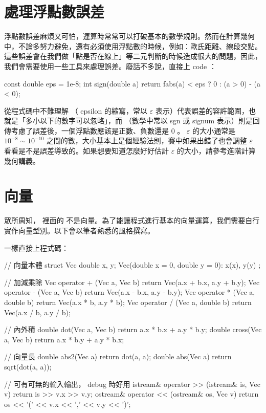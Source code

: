 \documentclass[main.tex]{subfiles}
\begin{document}
\section{處理浮點數誤差}
浮點數誤差麻煩又可怕，運算時常常可以打破基本的數學規則\footnotemark。然而在計算幾何中，不論多努力避免，還有必須使用浮點數的時候，例如：歐氏距離、線段交點。這些誤差會在我們做「點是否在線上」等二元判斷的時候造成很大的問題，因此，我們會需要使用一些工具來處理誤差。廢話不多說，直接上 code ：

\begin{C++}
const double eps = 1e-8;
int sign(double a) { return fabs(a) < eps ? 0 : (a > 0) - (a < 0); }
\end{C++}

從程式碼中不難理解  （ epsilon 的縮寫，常以 $\varepsilon$ 表示）代表誤差的容許範圍，也就是「多小以下的數字可以忽略」，而  （數學中常以 sgn 或 signum 表示）則是回傳考慮了誤差後，一個浮點數應該是正數、負數還是 0 。
$\varepsilon$ 的大小通常是 $10^{-8} \sim 10^{-10}$ 之間的數，大小基本上是個經驗法則，賽中如果出錯了也會調整 $\varepsilon$ 看看是不是誤差導致的。如果想要知道怎麼好好估計 $\varepsilon$ 的大小，請參考進階計算幾何講義。


\section{向量}

眾所周知，  裡面的  不是向量\footnotemark。為了能讓程式進行基本的向量運算，我們需要自行實作向量型別。以下會以筆者熟悉的風格撰寫。


一樣直接上程式碼：

\begin{C++}
// 向量本體
struct Vec {
	double x, y;
	Vec(double x = 0, double y = 0): x(x), y(y) {}
};

// 加減乘除
Vec operator + (Vec a, Vec b)
{ return Vec(a.x + b.x, a.y + b.y); }
Vec operator - (Vec a, Vec b)
{ return Vec(a.x - b.x, a.y - b.y); }
Vec operator * (Vec a, double b)
{ return Vec(a.x * b, a.y * b); }
Vec operator / (Vec a, double b)
{ return Vec(a.x / b, a.y / b); }

// 內外積
double dot(Vec a, Vec b)
{ return a.x * b.x + a.y * b.y; }
double cross(Vec a, Vec b)
{ return a.x * b.y + a.y * b.x; }

// 向量長
double abs2(Vec a)
{ return dot(a, a); }
double abs(Vec a)
{ return sqrt(dot(a, a)); }

// 可有可無的輸入輸出， debug 時好用
istream& operator >> (istream& is, Vec v)
{ return is >> v.x >> v.y; }
ostream& operator << (ostream& os, Vec v)
{ return os << '(' << v.x << ',' << v.y << ')'; }
\end{C++}
\end{document}
